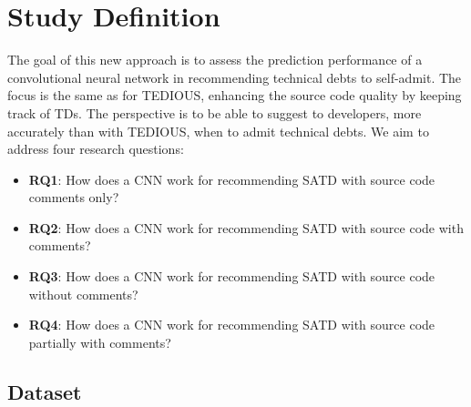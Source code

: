 \section{Study Definition}


The goal of this new approach is to assess the prediction performance of a convolutional neural network in recommending technical debts to self-admit. The focus is the same as for TEDIOUS, enhancing the source code quality by keeping track of TDs. The perspective is to be able to suggest to developers, more accurately than with TEDIOUS, when to admit technical debts. We aim to address four research questions:

\begin{itemize}
	\item \textbf{RQ1}: How does a CNN work for recommending SATD with source code comments only?
	\item \textbf{RQ2}: How does a CNN work for recommending SATD with source code  with comments?
	\item \textbf{RQ3}: How does a CNN work for recommending SATD with source code without comments?
	\item \textbf{RQ4}: How does a CNN work for recommending SATD with source code partially with comments?
\end{itemize}

\subsection{Dataset}



